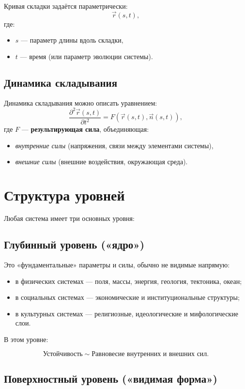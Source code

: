 \documentclass[12pt]{article}
\begin{document}
Кривая складки задаётся параметрически:
\[
 \vec{r}(s,t),
\]
где:
\begin{itemize}
  \item $s$ — параметр длины вдоль складки,
  \item $t$ — время (или параметр эволюции системы).
\end{itemize}

\subsection{Динамика складывания}

Динамика складывания можно описать уравнением:
\[
 \frac{\partial^2 \vec{r}(s,t)}{\partial t^2} = F(\vec{r}(s,t), \vec{n}(s,t)),
\]
где $F$ — \textbf{результирующая сила}, объединяющая:
\begin{itemize}
  \item \emph{внутренние силы} (напряжения, связи между элементами системы),
  \item \emph{внешние силы} (внешние воздействия, окружающая среда).
\end{itemize}

\section{Структура уровней}

Любая система имеет три основных уровня:

\subsection{Глубинный уровень («ядро»)}

Это «фундаментальные» параметры и силы, обычно не видимые напрямую:

\begin{itemize}
  \item в физических системах — поля, массы, энергия, геология, тектоника, океан;
  \item в социальных системах — экономические и институциональные структуры;
  \item в культурных системах — религиозные, идеологические и мифологические слои.
\end{itemize}

В этом уровне:

\[
 \text{Устойчивость} \sim \text{Равновесие внутренних и внешних сил}.
\]

\subsection{Поверхностный уровень («видимая форма»)}
\end{document}
